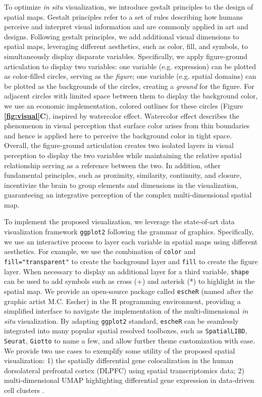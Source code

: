 \documentclass[11pt]{article}
\begin{document}
 To optimize \textit{in situ} visualization, we introduce gestalt principles to the design of spatial maps. Gestalt principles\cite{todorovic_2008, palmer_1999} refer to a set of rules describing how humans perceive and interpret visual information and are commonly applied in art and designs. Following gestalt principles, we add additional visual dimensions to spatial maps, leveraging different aesthetics, such as color, fill, and symbols, to simultaneously display disparate variables. Specifically, we apply figure-ground articulation to display two variables: one variable (e.g. expression) can be plotted as color-filled circles, serving as the \textit{figure}; one variable (e.g. spatial domains) can be plotted as the backgrounds of the circles, creating a \textit{ground} for the figure. For adjacent circles with limited space between them to display the background color, we use an economic implementation, colored outlines for these circles (Figure \textbf{\ref{fig:visual}C}), inspired by watercolor effect\cite{pinna_1987, pinna_2001}. Watercolor effect describes the phenomenon in visual perception that surface color arises from thin boundaries and hence is applied here to perceive the background color in tight space. Overall, the figure-ground articulation creates two isolated layers in visual perception to display the two variables while maintaining the relative spatial relationship serving as a reference between the two. In addition, other fundamental principles\cite{todorovic_2008}, such as proximity, similarity, continuity, and closure, incentivize the brain to group elements and dimensions in the visualization, guaranteeing an integrative perception of the complex multi-dimensional spatial map.
 

To implement the proposed visualization, we leverage the state-of-art data visualization framework \texttt{ggplot2}\cite{ggplot2} following the grammar of graphics\cite{wilkinson_2012}. Specifically, we use an interactive process to layer each variable in spatial maps using different aesthetics. For example, we use the combination of \texttt{color} and \texttt{fill="transparent"} to create the background layer and \texttt{fill} to create the figure layer. When necessary to display an additional layer for a third variable, \texttt{shape} can be used to add symbols such as cross (+) and asterisk (*) to highlight in the spatial map. We provide an open-source package called \texttt{escheR} (named after the graphic artist M.C. Escher) in the R programming environment\cite{R}, providing a simplified interface to navigate the implementation of the multi-dimensional \textit{in situ} visualization. By adapting \texttt{ggplot2} standard, \texttt{escheR} can be seamlessly integrated into many popular spatial resolved toolboxes, such as \texttt{SpatialLIBD}\cite{pardo_2022}, \texttt{Seurat}\cite{hao_2021}, \texttt{Giotto}\cite{dries_2021} to name a few, and allow further theme customization with ease. We provide two use cases to exemplify some utility of the proposed spatial visualization: 1) the spatially differential gene colocalization in the human dorsolateral prefrontal cortex (DLPFC) using spatial transcriptomics data\cite{huukimyers_2023}; 2) multi-dimensional UMAP highlighting differential gene expression in data-driven cell clusters \cite{freytag_2020}. 
\end{document}
